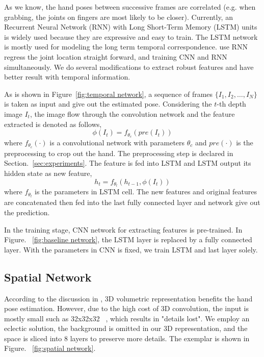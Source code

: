 \documentclass[journal,comsoc]{IEEEtran}
\begin{document}
As we know, the hand poses between successive frames are correlated (e.g. when grabbing, the joints
on fingers are most likely to be closer). Currently, an Recurrent Neural Network (RNN) with Long
Short-Term Memory (LSTM) units~\cite{zaremba2014learning} is widely used because they are expressive
and easy to train. The LSTM network is mostly used for modeling the long term temporal correspondence.
\cite{quach2016depth} use RNN regress the joint location straight forward, and training CNN and RNN
simultaneously. We do several modifications to extract robust features and have better result with
temporal information.

As is shown in Figure~\ref{fig:temporal network}, a sequence of frames $\{I_1, I_2, \dots, I_N\}$ is
taken as input and give out the estimated pose. Considering the $t$-th depth image $I_t$, the image
flow through the convolution network and the feature extracted is denoted as follows,
\begin{equation}
\phi(I_t)=f_{\theta_c}(pre(I_t))
\end{equation}
where $f_{\theta_c}(\cdot)$ is a convolutional network with parameters $\theta_c$ and
$pre(\cdot)$ is the preprocessing to crop out the hand. The preprocessing step is declared
in Section.~\ref{sec:experiments}. The feature is fed into LSTM and LSTM output its hidden
state as new feature,
\begin{equation}
h_t=f_{\theta_l}(h_{t-1}, \phi(I_t))
\end{equation}
where $f_{\theta_l}$ is the parameters in LSTM cell. The new features and original features
are concatenated then fed into the last fully connected layer and network give out the prediction.

In the training stage, CNN network for extracting features is pre-trained. In Figure.
~\ref{fig:baseline network}, the LSTM layer is replaced by a fully connected layer.
With the parameters in CNN is fixed, we train LSTM and last layer solely.

\subsection{Spatial Network}\label{sec:spatial network}
According to the discussion in \cite{supancic2015depth, deng2017hand3d, ge2017_3D}, 3D
volumetric representation benefits the hand pose estimation. However, due to the high
cost of 3D convolution, the input is mostly small such as 32x32x32
~\cite{deng2017hand3d, ge2017_3D}, which results in "details lost". We employ an eclectic
solution, the background is omitted in our 3D representation, and the space is sliced
into 8 layers to preserve more details. The exemplar is shown in Figure.
~\ref{fig:spatial network}.
\end{document}
